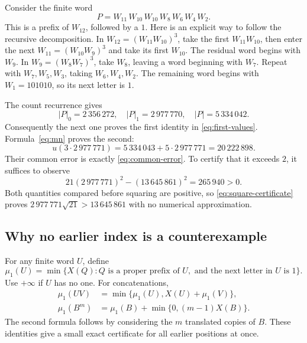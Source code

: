 \documentclass[11pt]{article}
\numberwithin{equation}{section}
\theoremstyle{definition}
\theoremstyle{remark}
\begin{document}
Consider the finite word
\begin{equation}\label{eq:P-witness}
P=W_{11}\,W_{10}\,W_{10}\,W_8\,W_6\,W_4\,W_2.
\end{equation}
This is a prefix of $W_{12}$, followed by a $1$. Here is an explicit
way to follow the recursive decomposition. In
$W_{12}=(W_{11}W_{10})^3$, take the first $W_{11}W_{10}$, then enter the
next $W_{11}=(W_{10}W_9)^3$ and take its first $W_{10}$. The residual
word begins with $W_9$. In $W_9=(W_8W_7)^3$, take $W_8$, leaving a word
beginning with $W_7$. Repeat with $W_7,W_5,W_3$, taking $W_6,W_4,W_2$.
The remaining word begins with $W_1=101010$, so its next letter is $1$.

The count recurrence gives
\begin{equation}\label{eq:P-counts}
|P|_0=2\,356\,272,\quad |P|_1=2\,977\,770,\quad
|P|=5\,334\,042.
\end{equation}
Consequently the next one proves the first identity in
\eqref{eq:first-values}. Formula~\eqref{eq:mn} proves the second:
\[
u(3\cdot2\,977\,771)=5\,334\,043+5\cdot2\,977\,771
=20\,222\,898.
\]
Their common error is exactly \eqref{eq:common-error}.
To certify that it exceeds $2$, it suffices to observe
\begin{equation}\label{eq:square-certificate}
21(2\,977\,771)^2-(13\,645\,861)^2=265\,940>0.
\end{equation}
Both quantities compared before squaring are positive, so
\eqref{eq:square-certificate} proves
$2\,977\,771\sqrt{21}>13\,645\,861$ with no numerical approximation.

\subsection{Why no earlier index is a counterexample}
For any finite word $U$, define
\[
\mu_1(U)=\min\{X(Q): Q\text{ is a proper prefix of }U,
\text{ and the next letter in }U\text{ is }1\}.
\]
Use $+\infty$ if $U$ has no one. For concatenations,
\begin{align}
\mu_1(UV)&=\min\{\mu_1(U),X(U)+\mu_1(V)\},\label{eq:min-concat}\\
\mu_1(B^m)&=\mu_1(B)+\min\{0,(m-1)X(B)\}.\label{eq:min-power}
\end{align}
The second formula follows by considering the $m$ translated copies of
$B$. These identities give a small exact certificate for all earlier
positions at once.
\end{document}
